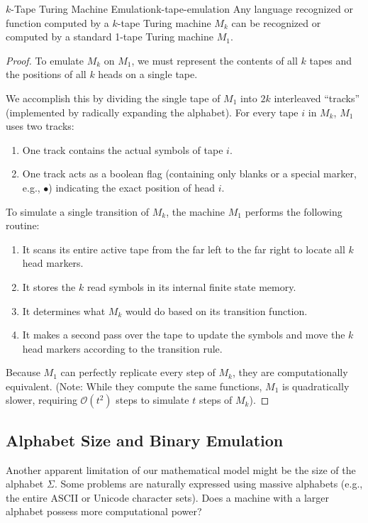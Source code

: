 \begin{theorem}{$k$-Tape Turing Machine Emulation}{k-tape-emulation}
    Any language recognized or function computed by a $k$-tape Turing machine $M_k$ can be recognized or computed by a standard 1-tape Turing machine $M_1$. 
    \begin{proof}
        To emulate $M_k$ on $M_1$, we must represent the contents of all $k$ tapes and the positions of all $k$ heads on a single tape. 
        
        We accomplish this by dividing the single tape of $M_1$ into $2k$ interleaved ``tracks'' (implemented by radically expanding the alphabet). For every tape $i$ in $M_k$, $M_1$ uses two tracks:
        \begin{enumerate}
            \item One track contains the actual symbols of tape $i$.
            \item One track acts as a boolean flag (containing only blanks or a special marker, e.g., $\bullet$) indicating the exact position of head $i$.
        \end{enumerate}
        
        To simulate a single transition of $M_k$, the machine $M_1$ performs the following routine:
        \begin{enumerate}
            \item It scans its entire active tape from the far left to the far right to locate all $k$ head markers.
            \item It stores the $k$ read symbols in its internal finite state memory.
            \item It determines what $M_k$ would do based on its transition function.
            \item It makes a second pass over the tape to update the symbols and move the $k$ head markers according to the transition rule.
        \end{enumerate}
        Because $M_1$ can perfectly replicate every step of $M_k$, they are computationally equivalent. (Note: While they compute the same functions, $M_1$ is quadratically slower, requiring $\mathcal{O}(t^2)$ steps to simulate $t$ steps of $M_k$).
    \end{proof}
\end{theorem}

\subsection{Alphabet Size and Binary Emulation}
Another apparent limitation of our mathematical model might be the size of the alphabet $\Sigma$. Some problems are naturally expressed using massive alphabets (e.g., the entire ASCII or Unicode character sets). Does a machine with a larger alphabet possess more computational power?

